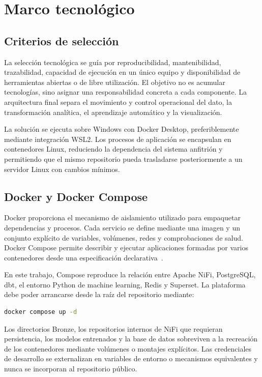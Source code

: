 \chapter{Marco tecnológico}\label{chap:tecnologia}

\section{Criterios de selección}

La selección tecnológica se guía por reproducibilidad, mantenibilidad, trazabilidad, capacidad de ejecución en un único equipo y disponibilidad de herramientas abiertas o de libre utilización. El objetivo no es acumular tecnologías, sino asignar una responsabilidad concreta a cada componente. La arquitectura final separa el movimiento y control operacional del dato, la transformación analítica, el aprendizaje automático y la visualización.

La solución se ejecuta sobre Windows con Docker Desktop, preferiblemente mediante integración WSL2. Los procesos de aplicación se encapsulan en contenedores Linux, reduciendo la dependencia del sistema anfitrión y permitiendo que el mismo repositorio pueda trasladarse posteriormente a un servidor Linux con cambios mínimos.

\section{Docker y Docker Compose}

Docker proporciona el mecanismo de aislamiento utilizado para empaquetar dependencias y procesos. Cada servicio se define mediante una imagen y un conjunto explícito de variables, volúmenes, redes y comprobaciones de salud. Docker Compose permite describir y ejecutar aplicaciones formadas por varios contenedores desde una especificación declarativa~\cite{docker_compose}.

En este trabajo, Compose reproduce la relación entre Apache NiFi, PostgreSQL, dbt, el entorno Python de machine learning, Redis y Superset. La plataforma debe poder arrancarse desde la raíz del repositorio mediante:

\begin{lstlisting}[language=bash,caption={Arranque general del entorno contenerizado.}]
docker compose up -d
\end{lstlisting}

Los directorios Bronze, los repositorios internos de NiFi que requieran persistencia, los modelos entrenados y la base de datos sobreviven a la recreación de los contenedores mediante volúmenes o montajes explícitos. Las credenciales de desarrollo se externalizan en variables de entorno o mecanismos equivalentes y nunca se incorporan al repositorio público.

